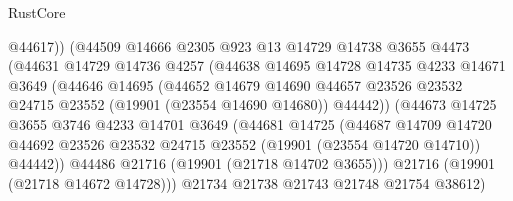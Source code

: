 \begin{lexlean}{RustCore}
\begin{coremodule}
                              @44617))
                          (@44509
                            @14666
                            @2305
                            @923
                            @13
                            @14729
                            @14738
                            @3655
                            @4473
                            (@44631
                              @14729
                              @14736
                              @4257
                              (@44638
                                @14695
                                @14728
                                @14735
                                @4233
                                @14671
                                @3649
                                (@44646
                                  @14695
                                  (@44652
                                    @14679
                                    @14690
                                    @44657
                                    @23526
                                    @23532
                                    @24715
                                    @23552
                                    (@19901 (@23554 @14690 @14680))
                                    @44442))
                                (@44673
                                  @14725
                                  @3655
                                  @3746
                                  @4233
                                  @14701
                                  @3649
                                  (@44681
                                    @14725
                                    (@44687
                                      @14709
                                      @14720
                                      @44692
                                      @23526
                                      @23532
                                      @24715
                                      @23552
                                      (@19901 (@23554 @14720 @14710))
                                      @44442))
                                  @44486
                                  @21716
                                  (@19901 (@21718 @14702 @3655)))
                                @21716
                                (@19901 (@21718 @14672 @14728)))
                              @21734
                              @21738
                              @21743
                              @21748
                              @21754
                              @38612)

\end{coremodule}
\end{lexlean}
